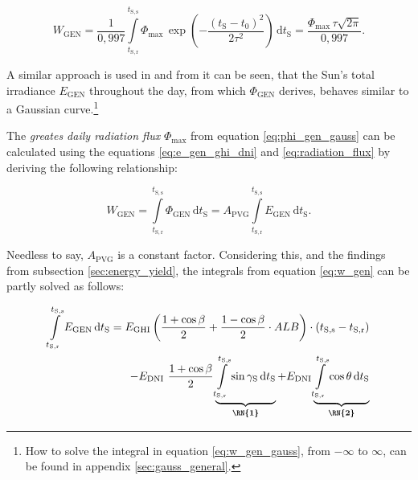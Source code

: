 \begin{center}
	\begin{equation} \label{eq:w_gen_gauss}
		W_\mathrm{GEN} = \frac{1}{0,997} \int\limits_{t_{\mathrm{S,r}}}^{t_{\mathrm{S,s}}} \Phi_{\mathrm{max}} \, \exp\left(-\frac{(t_{\mathrm{S}} - t_0)^2}{2 \tau^2}\right) \,\mathrm{d}t_\mathrm{S} = \frac{\Phi_{\mathrm{max}} \, \tau \sqrt{2\pi}}{0,997} \text{.}
	\end{equation}
\end{center}

A similar approach is used in \cite{Guo:2017, Nguyen:2020} and from \cite{Balafas:2010, Mertens:2015, Koudouris:2017} it can be seen, that the Sun's total irradiance $E_{\mathrm{GEN}}$ throughout the day, from which $\Phi_{\mathrm{GEN}}$ derives, behaves similar to a Gaussian curve.\footnote{How to solve the integral in equation \ref{eq:w_gen_gauss}, from $-\infty$ to $\infty$, can be found in appendix \ref{sec:gauss_general}.}

The \emph{greates daily radiation flux} $\Phi_{\mathrm{max}}$ from equation \ref{eq:phi_gen_gauss} can be calculated using the equations \ref{eq:e_gen_ghi_dni} and \ref{eq:radiation_flux} by deriving the following relationship\cite{Appelbaum:1993, Prechtl:2006, Prechtl:2008}:

\begin{center}
	\begin{equation} \label{eq:w_gen}
		W_\mathrm{GEN} = \int\limits_{t_{\mathrm{S,r}}}^{t_{\mathrm{S,s}}} \Phi_{\mathrm{GEN}}\,\mathrm{d}t_\mathrm{S} = A_{\mathrm{PVG}} \int\limits_{t_{\mathrm{S,r}}}^{t_{\mathrm{S,s}}} E_{\mathrm{GEN}}\,\mathrm{d}t_\mathrm{S} \text{.}
	\end{equation}
\end{center}

Needless to say, $A_{\mathrm{PVG}}$ is a constant factor. Considering this, and the findings from subsection \ref{sec:energy_yield}, the integrals from equation \ref{eq:w_gen} can be partly solved as follows:

\begin{center}
	\begin{equation} \label{eq:int_e_gen}
		\begin{split}
		\int\limits_{t_{\mathrm{S,r}}}^{t_{\mathrm{S,s}}} E_{\mathrm{GEN}}\,\mathrm{d}t_\mathrm{S} = E_{\mathrm{GHI}} \left( \frac{1 + \cos \beta}{2} + \frac{1 - \cos \beta}{2} \cdot ALB \right) \cdot \left(t_{\mathrm{S,s}} - t_{\mathrm{S,r}}\right) \\ 
		- E_{\mathrm{DNI}} \ \frac{1 + \cos \beta}{2} \underbrace{\int\limits_{t_{\mathrm{S,r}}}^{t_{\mathrm{S,s}}} \sin \gamma_{\mathrm{S}}\,\mathrm{d}t_\mathrm{S}}_\text{\textbf{\RN{1}}} + E_{\mathrm{DNI}} \underbrace{\int\limits_{t_{\mathrm{S,r}}}^{t_{\mathrm{S,s}}} \cos \theta \,\mathrm{d}t_\mathrm{S}}_\text{\textbf{\RN{2}}}
		\end{split}
	\end{equation}
\end{center}

